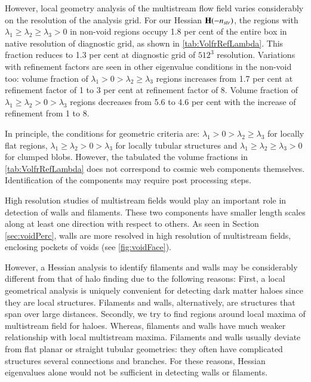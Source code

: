 However, local geometry analysis of the multistream flow field varies considerably on the resolution of the analysis grid. For our Hessian ${\bf H}(-n_{str})$, the regions with $\lambda_1 \geq \lambda_2 \geq \lambda_3 > 0$ in non-void regions occupy 1.8 per cent of the entire box in native resolution of diagnostic grid, as shown in \autoref{tab:VolfrRefLambda}. This fraction reduces to 1.3 per cent at diagnostic grid of $512^3$ resolution. Variations with refinement factors are seen in other eigenvalue conditions in the non-void too: volume fraction of $\lambda_1 > 0 > \lambda_2 \geq \lambda_3 $ regions increases from 1.7 per cent at refinement factor of 1 to 3 per cent at refinement factor of 8. Volume fraction of $\lambda_1 \geq \lambda_2 > 0 > \lambda_3 $ regions decreases from 5.6 to 4.6 per cent with the increase of refinement from 1 to 8. 

In principle, the conditions for geometric criteria are: $\lambda_1 > 0 > \lambda_2 \geq \lambda_3$ for locally flat regions, $\lambda_1 \geq \lambda_2 > 0 > \lambda_3 $ for locally tubular structures and $\lambda_1 \geq \lambda_2 \geq \lambda_3 > 0$ for clumped blobs. However, the tabulated the volume fractions in \autoref{tab:VolfrRefLambda} does not correspond to cosmic web components themselves. Identification of the components may require post processing steps. 

High resolution studies of multistream fields would play an important role in detection of walls and filaments. These two components have smaller length scales along at least one direction with respect to others. As seen in Section \ref{sec:voidPerc}, walls are more resolved in high resolution of multistream fields, enclosing pockets of voids (see \autoref{fig:voidFace}).  

However, a Hessian analysis to identify filaments and walls may be considerably different from that of halo finding due to the following reasons: First, a local geometrical analysis is uniquely convenient for detecting dark matter haloes since they are local structures. Filaments and walls, alternatively, are structures that span over large distances. Secondly, we try to find regions around local maxima of multistream field for haloes. Whereas, filaments and walls have much weaker relationship with local multistream maxima. Filaments and walls usually deviate from flat planar or straight tubular geometries: they often have complicated structures several connections and branches. For these reasons, Hessian eigenvalues alone would not be sufficient in detecting walls or filaments. 

